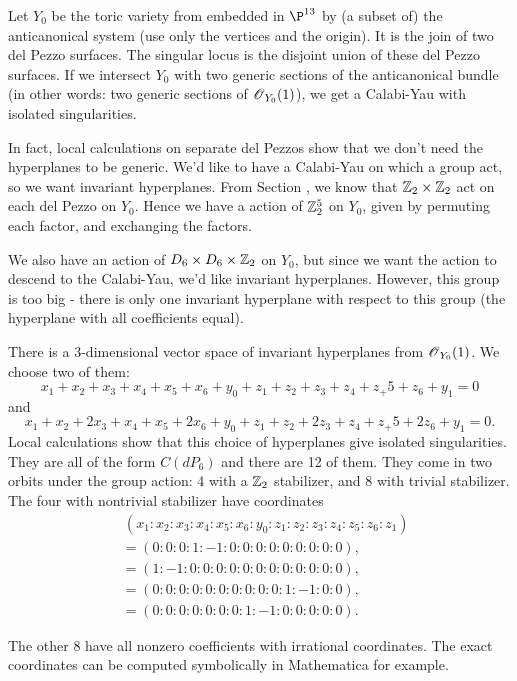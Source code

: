 \documentclass[11pt, english]{article}
\begin{document}
Let $Y_0$ be the toric variety from \label{sec:toric5} embedded in $\P^{13}$ by (a subset of) the anticanonical system (use only the vertices and the origin). It is the join of two del Pezzo surfaces. The singular locus is the disjoint union of these del Pezzo surfaces. If we intersect $Y_0$ with two generic sections of the anticanonical bundle (in other words: two generic sections of $\operatorname{\mathscr{O}}_{Y_0}(1)$), we get a Calabi-Yau with isolated singularities.

In fact, local calculations on separate del Pezzos show that we don't need the hyperplanes to be generic. We'd like to have a Calabi-Yau on which a group act, so we want invariant hyperplanes. From Section \label{sec:delpezzoz2}, we know that $\mathbb{Z}_2 \times \mathbb{Z}_2$ act on each del Pezzo on $Y_0$. Hence we have a action of $\mathbb{Z}_2^5$ on $Y_0$, given by permuting each factor, and exchanging the factors.

\begin{remark}
We also have an action of $D_6 \times D_6 \times \mathbb{Z}_2$ on $Y_0$, but since we want the action to descend to the Calabi-Yau, we'd like invariant hyperplanes. However, this group is too big - there is only one invariant hyperplane with respect to this group (the hyperplane with all coefficients equal).
\end{remark}

There is a 3-dimensional vector space of invariant hyperplanes from $\operatorname{\mathscr{O}}_{Y_0}(1)$. We choose two of them:
\[
x_1+x_2+x_3+x_4+x_5+x_6+y_0+z_1+z_2+z_3+z_4+z_+5+z_6+y_1 = 0
\]
and
\[
x_1+x_2+2x_3+x_4+x_5+2x_6+y_0+z_1+z_2+2z_3+z_4+z_+5+2z_6+y_1 = 0.
\]
Local calculations show that this choice of hyperplanes give isolated singularities. They are all of the form $C(dP_6)$ and there are 12 of them. They come in two orbits under the group action: $4$ with a $\mathbb{Z}_2$ stabilizer, and $8$ with trivial stabilizer. The four with nontrivial stabilizer have coordinates
\begin{align*}
&\, (x_1:x_2:x_3:x_4:x_5:x_6:y_0:z_1:z_2:z_3:z_4:z_5:z_6:z_1)  \\
&= (0:0:0:1:-1:0:0:0:0:0:0:0:0:0), \\
&= (1:-1:0:0:0:0:0:0:0:0:0:0:0:0), \\
&= (0:0:0:0:0:0:0:0:0:0:1:-1:0:0), \\
&= (0:0:0:0:0:0:0:1:-1:0:0:0:0:0).
\end{align*}

The other $8$ have all nonzero coefficients with irrational coordinates. The exact coordinates can be computed symbolically in Mathematica for example.
\end{document}
